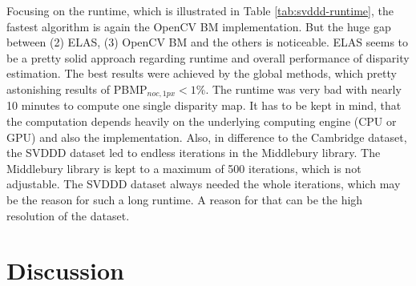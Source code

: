 \noindent Focusing on the runtime, which is illustrated in Table \ref{tab:svddd-runtime}, the fastest algorithm is again the OpenCV BM implementation.
But the huge gap between (2) ELAS, (3) OpenCV BM and the others is noticeable.
ELAS seems to be a pretty solid approach regarding runtime and overall performance of disparity estimation.
The best results were achieved by the global methods, which pretty astonishing results of PBMP$_{noc,1px} < 1\%$.
The runtime was very bad with nearly 10 minutes to compute one single disparity map.
It has to be kept in mind, that the computation depends heavily on the underlying computing engine (CPU or GPU) and also the implementation.
Also, in difference to the Cambridge dataset, the SVDDD dataset led to endless iterations in the Middlebury library.
The Middlebury library is kept to a maximum of 500 iterations, which is not adjustable.
The SVDDD dataset always needed the whole iterations, which may be the reason for such a long runtime.
A reason for that can be the high resolution of the dataset.

\begin{table}[h!]
\centering
{}
\caption[Result table for runtime of SVDDD]{Result table for runtime of SVDDD}
\label{tab:svddd-runtime}
\end{table}

\section{Discussion}

